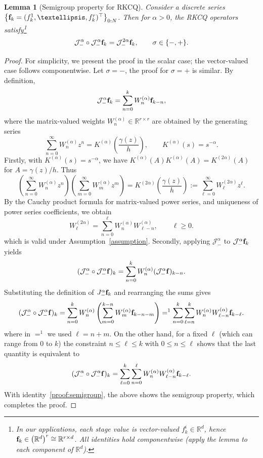 \documentclass[10pt,a4paper]{amsart}
\newtheorem{lemma}{Lemma}
\newcommand{\R}{\mathbb{R}}      %
\begin{document}
\begin{lemma}[Semigroup property for RKCQ]\label{lemma:Semi_group}
Consider a discrete series $\left\{ {\bf f}_k=(f_k^1,\ldots,f_k^r)^\top\right\}_{0:N}$. Then for $\alpha>0$, the RKCQ operators satisfy\footnote{\color{blue}In our applications, each stage value is vector-valued 
$f_k^i\in \R^d$, hence ${\bf f}_k\in \big(\R^d\big)^r\cong \R^{r\times d}$. All identities hold componentwise (apply the lemma to each component of $\R^d$).}
\[
\mathcal J_-^\alpha \circ \mathcal J_-^\alpha  {\bf f}_k
=
\mathcal J_-^{2\alpha} {\bf f}_k,\qquad \sigma\in \{-,+\}.
\]
\end{lemma}

\begin{proof}
For simplicity, we present the proof in the scalar case; the vector-valued case follows componentwise. Let  $\sigma=-$, the proof for $\sigma=+$ is similar. By definition,
\[
\mathcal J_-^\alpha {\bf f}_k
=
\sum_{n=0}^{k} W_n^{(\alpha)} {\bf f}_{k-n},
\]
where the matrix-valued weights $W_n^{(\alpha)} \in \mathbb{R}^{r\times r}$ are obtained by the generating series
\[
\sum_{n=0}^{\infty}
W_n^{(\alpha)} z^n
=
K^{(\alpha)}\!\left(\frac{\gamma(z)}{h}\right),
\qquad
K^{(\alpha)}(s)=s^{-\alpha}.
\]
Firstly, with $K^{(\alpha)}(s)=s^{-\alpha}$, we have
$
K^{(\alpha)}(A)K^{(\alpha)}(A)
=
K^{(2\alpha)}(A)$ for 
$A=\gamma(z)/h$. Thus
\[
\left(
\sum_{n=0}^{\infty}
W_n^{(\alpha)} z^n
\right)\left(
\sum_{m=0}^{\infty}
W_m^{(\alpha)} z^m
\right)
=
K^{(2\alpha)}\!\left(\frac{\gamma(z)}{h}\right):=\sum_{\ell=0}^{\infty}
W_\ell^{(2\alpha)} z^\ell.
\]
By the Cauchy product formula for matrix-valued power series, and uniqueness of power series coefficients, we obtain
\begin{equation}\label{proof:semigroup}
     W_\ell^{(2\alpha)}
=\sum_{n =0}^{\ell}W_{n}^{(\alpha)} W_{\ell-n }^{(\alpha)},\qquad \ell \geq 0.
\end{equation}
which is valid under Assumption~\ref{assumption}. Secondly, applying $\mathcal J_-^\alpha$ to $\mathcal J_-^\alpha {\bf f}_k$ yields
\[
(\mathcal J_-^\alpha\circ \mathcal J_-^\alpha {\bf f})_k
=
\sum_{n=0}^{k}
W_n^{(\alpha)}
(\mathcal J_-^\alpha {\bf f})_{k-n}.
\]
Substituting the definition of $J_-^\alpha {\bf f}_k$ and rearranging the sums gives
\begin{align*}
(\mathcal J_-^\alpha \circ\mathcal J_-^\alpha {\bf f})_k
=
\sum_{n=0}^{k}
W_n^{(\alpha)}
\left(
\sum_{m =0}^{k-n}
W_m ^{(\alpha)} 
{\bf f}_{k-n-m}
\right)  
=^{1}\sum_{n=0}^{k}
\sum_{\ell=n}^{k} W_{n}^{(\alpha)} W_{\ell-n}^{(\alpha)} {\bf f}_{k-\ell}.
\end{align*}
where in $=^1$ we used $\ell=n+m$. On the other hand, for a fixed $\ell$ (which can range from $0$ to  $k$) the constraint  $n\leq \ell\leq k$ with  $0\leq n\leq \ell$ shows that the last quantity is equivalent to
\begin{align*}
(\mathcal J_-^\alpha \circ\mathcal J_-^\alpha {\bf f})_k=
\sum_{\ell=0}^{k} \sum_{n=0}^{\ell}W_{n}^{(\alpha)} W_{\ell-n}^{(\alpha)} {\bf f}_{k-\ell}.
\end{align*}
With identity~\eqref{proof:semigroup}, the above shows the semigroup property, which completes the proof.
\end{proof}
\end{document}
